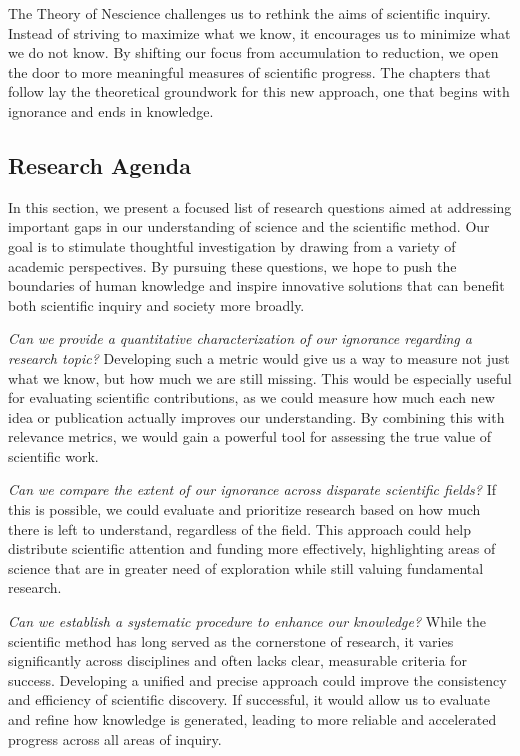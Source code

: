 \medskip

The Theory of Nescience challenges us to rethink the aims of scientific inquiry. Instead of striving to maximize what we know, it encourages us to minimize what we do not know. By shifting our focus from accumulation to reduction, we open the door to more meaningful measures of scientific progress. The chapters that follow lay the theoretical groundwork for this new approach, one that begins with ignorance and ends in knowledge.

%
%

\subsection*{Research Agenda}

In this section, we present a focused list of research questions aimed at addressing important gaps in our understanding of science and the scientific method. Our goal is to stimulate thoughtful investigation by drawing from a variety of academic perspectives. By pursuing these questions, we hope to push the boundaries of human knowledge and inspire innovative solutions that can benefit both scientific inquiry and society more broadly.

\emph{Can we provide a quantitative characterization of our ignorance regarding a research topic?} Developing such a metric would give us a way to measure not just what we know, but how much we are still missing. This would be especially useful for evaluating scientific contributions, as we could measure how much each new idea or publication actually improves our understanding. By combining this with relevance metrics, we would gain a powerful tool for assessing the true value of scientific work.

\emph{Can we compare the extent of our ignorance across disparate scientific fields?} If this is possible, we could evaluate and prioritize research based on how much there is left to understand, regardless of the field. This approach could help distribute scientific attention and funding more effectively, highlighting areas of science that are in greater need of exploration while still valuing fundamental research.

\emph{Can we establish a systematic procedure to enhance our knowledge?} While the scientific method has long served as the cornerstone of research, it varies significantly across disciplines and often lacks clear, measurable criteria for success. Developing a unified and precise approach could improve the consistency and efficiency of scientific discovery. If successful, it would allow us to evaluate and refine how knowledge is generated, leading to more reliable and accelerated progress across all areas of inquiry.

